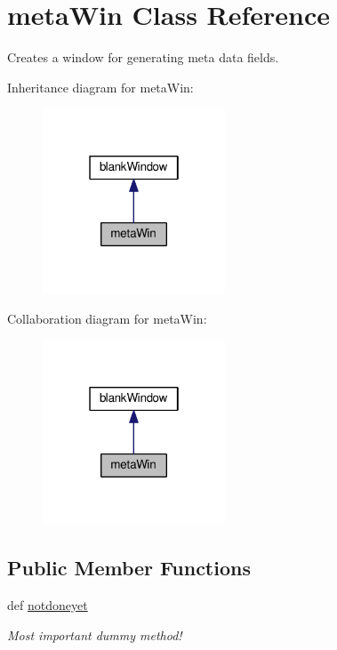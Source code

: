 \hypertarget{classgui_1_1window2_1_1metaWin}{\section{meta\-Win Class Reference}
\label{classgui_1_1window2_1_1metaWin}
}


Creates a window for generating meta data fields.  




Inheritance diagram for meta\-Win\-:\nopagebreak
\begin{figure}[H]
\begin{center}
\leavevmode
\includegraphics[width=154pt]{classgui_1_1window2_1_1metaWin__inherit__graph}
\end{center}
\end{figure}


Collaboration diagram for meta\-Win\-:\nopagebreak
\begin{figure}[H]
\begin{center}
\leavevmode
\includegraphics[width=154pt]{classgui_1_1window2_1_1metaWin__coll__graph}
\end{center}
\end{figure}
\subsection*{Public Member Functions}
\begin{DoxyCompactItemize}
\item 
\hypertarget{classgui_1_1window2_1_1metaWin_a615f3073891733337c33f599f89ec7ef}{def \hyperlink{classgui_1_1window2_1_1metaWin_a615f3073891733337c33f599f89ec7ef}{notdoneyet}}\label{classgui_1_1window2_1_1metaWin_a615f3073891733337c33f599f89ec7ef}

\begin{DoxyCompactList}\small\item\em Most important dummy method! \end{DoxyCompactList}\end{DoxyCompactItemize}



